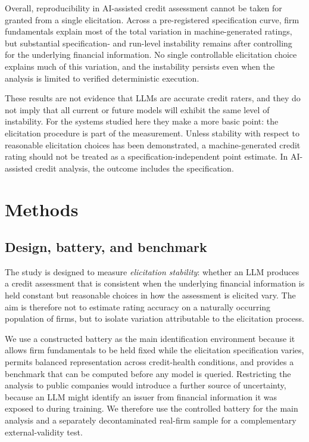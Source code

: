 \documentclass[pdflatex,sn-nature,lineno]{sn-jnl}
\theoremstyle{thmstyleone}
\begin{document}
Overall, reproducibility in AI-assisted credit assessment cannot be taken for granted from a
single elicitation. Across a pre-registered specification curve, firm fundamentals explain most of the
total variation in machine-generated ratings, but substantial specification- and run-level instability
remains after controlling for the underlying financial information. No single controllable elicitation
choice explains much of this variation, and the instability persists even when the analysis is limited to
verified deterministic execution.

These results are not evidence that LLMs are accurate credit raters, and they do not imply that all
current or future models will exhibit the same level of instability. For the systems studied here they
make a more basic point: the elicitation procedure is part of the measurement. Unless stability with
respect to reasonable elicitation choices has been demonstrated, a machine-generated credit rating should
not be treated as a specification-independent point estimate. In AI-assisted credit analysis, the outcome
includes the specification.

\section{Methods}
\subsection{Design, battery, and benchmark}
The study is designed to measure \emph{elicitation stability}: whether an LLM produces a credit
assessment that is consistent when the underlying financial information is held constant but reasonable
choices in how the assessment is elicited vary. The aim is therefore not to estimate rating accuracy on a
naturally occurring population of firms, but to isolate variation attributable to the elicitation
process.

We use a constructed battery as the main identification environment because it allows firm fundamentals
to be held fixed while the elicitation specification varies, permits balanced representation across
credit-health conditions, and provides a benchmark that can be computed before any model is queried.
Restricting the analysis to public companies would introduce a further source of uncertainty,
because an LLM might identify an issuer from financial information it was exposed to during training. We
therefore use the controlled battery for the main analysis and a separately decontaminated real-firm
sample for a complementary external-validity test.
\end{document}
